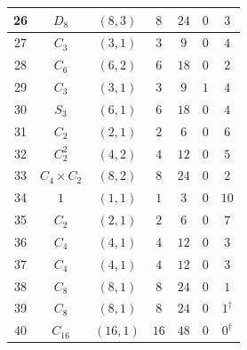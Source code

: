 \documentclass[12pt]{amsart}
\numberwithin{equation}{section}
\theoremstyle{plain}
\theoremstyle{definition}
\theoremstyle{remark}
\begin{document}
{\begin{longtable}{|c|c|c|c|c|c|c|}
26 & $D_8$                                & $(8,3)$     & $8$    & $24$    & $0$ & $3$ \\ \hline
27 & $C_3$                                & $(3,1)$     & $3$    & $9$     & $0$ & $4$ \\ \hline
28 & $C_6$                                & $(6,2)$     & $6$    & $18$    & $0$ & $2$ \\ \hline
29 & $C_3$                                & $(3,1)$     & $3$    & $9$     & $1$ & $4$ \\ \hline
30 & $S_3$                                & $(6,1)$     & $6$    & $18$    & $0$ & $4$ \\ \hline
31 & $C_2$                                & $(2,1)$     & $2$    & $6$     & $0$ & $6$ \\ \hline
32 & $C_2^2$                              & $(4,2)$     & $4$    & $12$    & $0$ & $5$ \\ \hline
33 & $C_4\times C_2$                     & $(8,2)$     & $8$    & $24$    & $0$ & $2$ \\ \hline
34 & $1$                                  & $(1,1)$     & $1$    & $3$     & $0$ & $10$ \\ \hline
35 & $C_2$                                & $(2,1)$     & $2$    & $6$     & $0$ & $7$ \\ \hline
36 & $C_4$                                & $(4,1)$     & $4$    & $12$    & $0$ & $3$ \\ \hline
37 & $C_4$                                & $(4,1)$     & $4$    & $12$    & $0$ & $3$ \\ \hline
38 & $C_8$                                & $(8,1)$     & $8$    & $24$    & $0$ & $1$ \\ \hline
39 & $C_8$                                & $(8,1)$     & $8$    & $24$    & $0$ & $1^\dagger$ \\ \hline
40 & $C_{16}$                             & $(16,1)$    & $16$   & $48$    & $0$ & $0^\dagger$ \\ \hline
\end{longtable}
}
%
\end{document}
